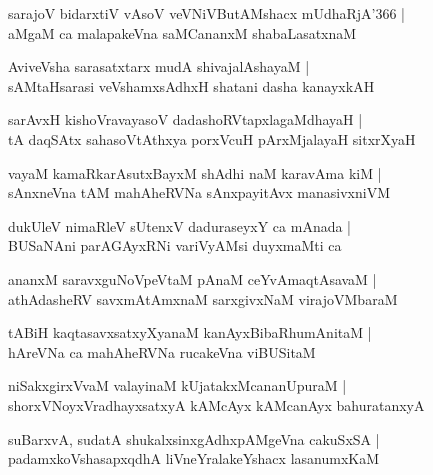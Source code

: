 \documentclass[twoside,12pt,openright]{book}
\newcounter{shloka}[chapter]
\begin{document}
\begin{shloka}%
sarajoV bidarxtiV vAsoV veVNiVButAMshacx mUdhaRjA\char'366 |\\
aMgaM ca malapakeVna saMCananxM shabaLasatxnaM 
\end{shloka}

\begin{shloka}%
AviveVsha sarasatxtarx mudA shivajalAshayaM |\\
sAMtaHsarasi veVshamxsAdhxH shatani dasha kanayxkAH 
\end{shloka}

\begin{shloka}%
sarAvxH kishoVravayasoV dadashoRVtapxlagaMdhayaH |\\
tA daqSAtx sahasoVtAthxya porxVcuH pArxMjalayaH sitxrXyaH 
\end{shloka}

\begin{shloka}%
vayaM kamaRkarAsutxBayxM shAdhi naM karavAma kiM |\\
sAnxneVna tAM mahAheRVNa sAnxpayitAvx manasivxniVM 
\end{shloka}

\begin{shloka}%
dukUleV nimaRleV sUtenxV daduraseyxY ca mAnada |\\
BUSaNAni parAGAyxRNi variVyAMsi duyxmaMti ca 
\end{shloka}

\begin{shloka}%
ananxM saravxguNoVpeVtaM pAnaM ceYvAmaqtAsavaM |\\
athAdasheRV savxmAtAmxnaM sarxgivxNaM virajoVMbaraM 
\end{shloka}

\begin{shloka}%
tABiH kaqtasavxsatxyXyanaM kanAyxBibaRhumAnitaM |\\
hAreVNa ca mahAheRVNa rucakeVna viBUSitaM 
\end{shloka}

\begin{shloka}%
niSakxgirxVvaM valayinaM kUjatakxMcananUpuraM |\\
shorxVNoyxVradhayxsatxyA kAMcAyx kAMcanAyx bahuratanxyA 
\end{shloka}

\begin{shloka}%
suBarxvA, sudatA shukalxsinxgAdhxpAMgeVna cakuSxSA |\\
padamxkoVshasapxqdhA liVneYralakeYshacx lasanumxKaM 
\end{shloka}
\end{document}
